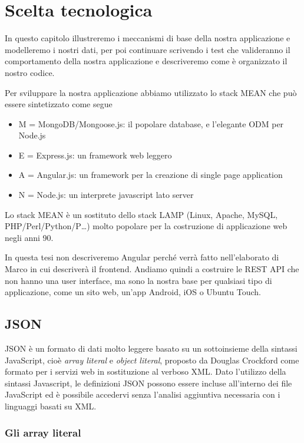 \chapter{Scelta tecnologica}
\label{chap:scelta}
\nocite{rest}

In questo capitolo illustreremo i meccanismi di base della nostra applicazione e modelleremo i nostri dati, per poi continuare scrivendo i test che valideranno il comportamento della nostra applicazione e descriveremo come è organizzato il nostro codice.


Per sviluppare la nostra applicazione abbiamo utilizzato lo stack MEAN che può essere sintetizzato come segue
\begin{itemize}
\item M = MongoDB/Mongoose.js: il popolare database, e l'elegante ODM per Node.js
\item E = Express.js: un framework web leggero
\item A = Angular.js: un framework per la creazione di single page application
\item N = Node.js: un interprete javascript lato server
\end{itemize}
Lo stack MEAN è un sostituto dello stack LAMP (Linux, Apache, MySQL, PHP/Perl/Python/P…) molto popolare per la costruzione di applicazione web negli anni 90.

In questa tesi non descriveremo Angular perché verrà fatto nell'elaborato di Marco in cui descriverà il frontend. 
Andiamo quindi a costruire le REST API che non hanno una user interface, ma sono la nostra base per qualsiasi tipo di applicazione, come un sito web, un'app Android, iOS o Ubuntu Touch.

\section{JSON}
\nocite{ajax}
JSON è un formato di dati molto leggere basato su un sottoinsieme della sintassi JavaScript, cioè \emph{array literal} e \emph{object literal}, proposto da Douglas Crockford come formato per i servizi web in sostituzione al verboso XML.
Dato l'utilizzo della sintassi Javascript, le definizioni JSON possono essere incluse all'interno dei file JavaScript ed è possibile accedervi senza l'analisi aggiuntiva necessaria con i linguaggi basati su XML.
\subsection{Gli array literal}

